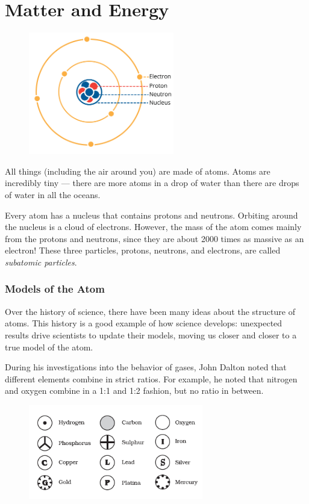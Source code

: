 \chapter{Matter and Energy}

\begin{figure}
\noindent\includegraphics[trim={0 5cm 0 0}, width=2.5in]{atom1.png}
\end{figure}

All things (including the air around you) are made of atoms. Atoms are
incredibly tiny --- there are more atoms in a drop of water than there are
drops of water in all the oceans.

Every atom has a nucleus that contains protons and neutrons. Orbiting around the
nucleus is a cloud of electrons. However, the mass of the atom
comes mainly from the protons and neutrons, since they are about 2000 times as
massive as an electron! These three particles, protons, neutrons, and
electrons, are called \textit{subatomic particles}. 
 

\subsection{Models of the Atom}
Over the history of science, there have been many ideas about the structure of
atoms. This history is a good example of how science develops: unexpected
results drive scientists to update their models, moving us closer and closer to
a true model of the atom.

During his investigations into the behavior of gases,
John Dalton noted that different elements combine in strict
ratios. For example, he noted that nitrogen and oxygen combine in a 1:1 and 1:2
fashion, but no ratio in between.

\begin{figure}
\noindent\includegraphics[width=3in]{daltons_model.png}
\end{figure}

